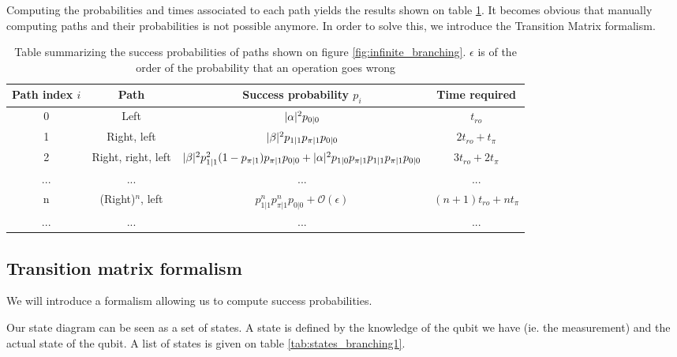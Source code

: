 Computing the probabilities and times associated to each path yields the results shown on table \ref{tab:path_infinite_branching_table}. It becomes obvious that manually computing paths and their probabilities is not possible anymore. In order to solve this, we introduce the Transition Matrix formalism.

 \begin{table}[H]
     \begin{tabular}{c|c|c|c}
       Path index $i$ & Path & Success probability $p_i$ & Time required \\ \hline
        0 & Left & $\lvert \alpha \rvert^2 p_{0|0}$ & $t_{ro}$ \\
        1 &  Right, left & $\lvert \beta \rvert^2p_{1|1}p_{\pi|1}p_{0|0}$ & $2t_{ro} + t_\pi$ \\
        2 &  Right, right, left & $\lvert \beta \rvert^2 p_{1|1}^2 (1-p_{\pi|1}) p_{\pi|1} p_{0|0} + \lvert \alpha \rvert^2 p_{1|0} p_{\pi|1} p_{1|1} p_{\pi|1} p_{0|0} $ & $3t_{ro} + 2t_\pi$ \\
         ... & ... & ... & ... \\
        n & (Right)$^n$, left & $p_{1|1}^np_{\pi|1}^np_{0|0} + \mathcal{O}(\epsilon)$ & $(n+1)t_{ro} + nt_\pi$ \\
        ... & ... & ... & ...
     \end{tabular}
     \caption{Table summarizing the success probabilities of paths shown on figure \ref{fig:infinite_branching}. $\epsilon$ is of the order of the probability that an operation goes wrong}
     \label{tab:path_infinite_branching_table}
 \end{table}
 
 \subsection{Transition matrix formalism}


We will introduce a formalism allowing us to compute success probabilities. 


Our state diagram can be seen as a set of states. A state is defined by the knowledge of the qubit we have (ie. the measurement) and the actual state of the qubit. A list of states is given on table \ref{tab:states_branching1}.
 
